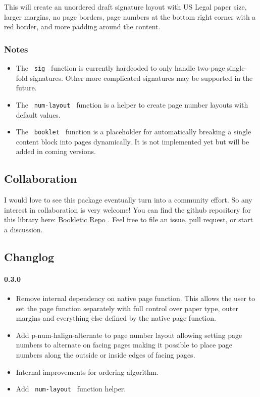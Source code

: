 This will create an unordered draft signature layout with US Legal paper
size, larger margins, no page borders, page numbers at the bottom right
corner with a red border, and more padding around the content.

\subsubsection{Notes}\label{notes}

\begin{itemize}
\tightlist
\item
  The \texttt{\ sig\ } function is currently hardcoded to only handle
  two-page single-fold signatures. Other more complicated signatures may
  be supported in the future.
\item
  The \texttt{\ num-layout\ } function is a helper to create page number
  layouts with default values.
\item
  The \texttt{\ booklet\ } function is a placeholder for automatically
  breaking a single content block into pages dynamically. It is not
  implemented yet but will be added in coming versions.
\end{itemize}

\subsection{Collaboration}\label{collaboration}

I would love to see this package eventually turn into a community
effort. So any interest in collaboration is very welcome! You can find
the github repository for this library here:
\href{https://github.com/harrellbm/Bookletic}{Bookletic Repo} . Feel
free to file an issue, pull request, or start a discussion.

\subsection{Changlog}\label{changlog}

\paragraph{0.3.0}\label{section}

\begin{itemize}
\tightlist
\item
  Remove internal dependency on native page function. This allows the
  user to set the page function separately with full control over paper
  type, outer margins and everything else defined by the native page
  function.
\item
  Add p-num-halign-alternate to page number layout allowing setting page
  numbers to alternate on facing pages making it possible to place page
  numbers along the outside or inside edges of facing pages.
\item
  Internal improvements for ordering algorithm.
\item
  Add \texttt{\ num-layout\ } function helper.
\end{itemize}

